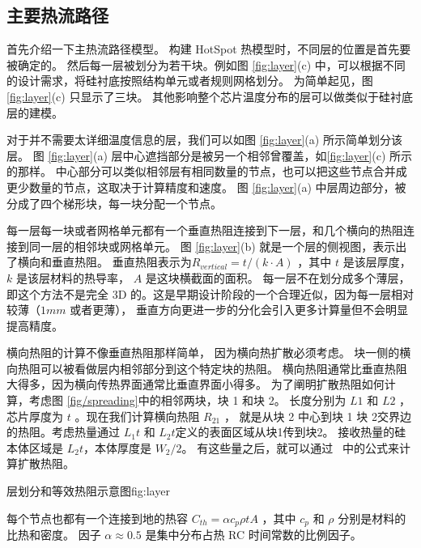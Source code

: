 \subsection{主要热流路径}\label{sec:primary}

首先介绍一下主热流路径模型。
构建 HotSpot 热模型时，不同层的位置是首先要被确定的。
然后每一层被划分为若干块。例如图 \ref{fig:layer}(c) 中，可以根据不同的设计需求，将硅衬底按照结构单元或者规则网格划分。
为简单起见，图 \ref{fig:layer}(c) 只显示了三块。
其他影响整个芯片温度分布的层可以做类似于硅衬底层的建模。

对于并不需要太详细温度信息的层，我们可以如图 \ref{fig:layer}(a) 所示简单划分该层。
图 \ref{fig:layer}(a) 层中心遮挡部分是被另一个相邻曾覆盖，如\ref{fig:layer}(c) 所示的那样。
中心部分可以类似相邻层有相同数量的节点，也可以把这些节点合并成更少数量的节点，这取决于计算精度和速度。
图 \ref{fig:layer}(a) 中层周边部分，被分成了四个梯形块，每一块分配一个节点。

每一层每一块或者网格单元都有一个垂直热阻连接到下一层，和几个横向的热阻连接到同一层的相邻块或网格单元。
图 \ref{fig:layer}(b) 就是一个层的侧视图，表示出了横向和垂直热阻。
垂直热阻表示为$R_{vertical} = t/(k \cdot A)$ ，其中 $t$ 是该层厚度， $k$ 是该层材料的热导率， $A$ 是这块横截面的面积。
每一层不在划分成多个薄层，即这个方法不是完全 3D 的。这是早期设计阶段的一个合理近似，因为每一层相对较薄（$1 mm$ 或者更薄），
垂直方向更进一步的分化会引入更多计算量但不会明显提高精度。


 
横向热阻的计算不像垂直热阻那样简单，
因为横向热扩散必须考虑。
块一侧的横向热阻可以被看做层内相邻部分到这个特定块的热阻。
横向热阻通常比垂直热阻大得多，因为横向传热界面通常比垂直界面小得多。
为了阐明扩散热阻如何计算，考虑图 \ref{fig/spreading}中的相邻两块，块 1 和块 2。
长度分别为 $L1$ 和 $L2$ ，芯片厚度为 $t$ 。现在我们计算横向热阻 $R_{21}$ ， 
就是从块 2 中心到块 1 块 2交界边的热阻。考虑热量通过 $L_1t$ 和 $L_2t$定义的表面区域从块1传到块2。
接收热量的硅本体区域是 $L_2t$，本体厚度是 $W_2/2$。
有这些量之后，就可以通过~\cite{song1995constriction} 中的公式来计算扩散热阻。

 \begin{pics}{层划分和等效热阻示意图}{fig:layer}
 \end{pics}

每个节点也都有一个连接到地的热容 $C_{th} = \alpha c_p \rho t A$ ，其中 $c_p$ 和 $\rho$ 分别是材料的比热和密度。
因子  $\alpha \approx 0.5$ 是集中分布占热 RC 时间常数的比例因子。

